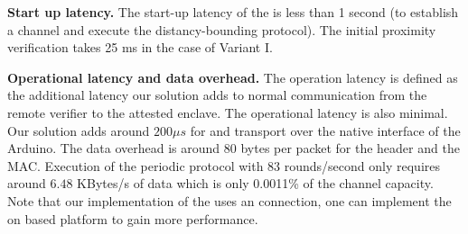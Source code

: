 \begin{mylist}
  \item \textbf{Start up latency.} The start-up latency of the \device is less than 1 second (to establish a \tls channel and execute the distancy-bounding protocol). The initial proximity verification takes 25 ms in the case of Variant I.

  \item \textbf{Operational latency and data overhead.} The operation latency is defined as the additional latency our solution adds to normal communication from the remote verifier to the attested enclave. The operational latency is also minimal. Our solution adds around $200 \mu s$ for \tls and transport over the native \usb interface of the Arduino.
  The data overhead is around 80 bytes per packet for the header and the MAC. Execution of the periodic \name protocol with $83$ rounds/second only requires around $6.48$ KBytes/s of data which is only 0.0011\% of the  channel capacity. Note that our implementation of the \device uses an  connection, one can implement the \device on  based platform to gain more performance.


\end{mylist}
